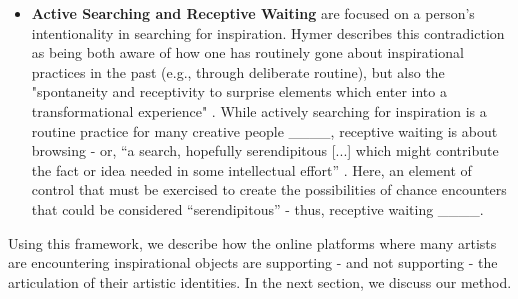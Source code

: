 \begin{itemize}
\item \textbf{Active Searching and Receptive Waiting} are focused on a person's intentionality in searching for inspiration. Hymer describes this contradiction as being both aware of how one has routinely gone about inspirational practices in the past (e.g., through deliberate routine), but also the "spontaneity and receptivity to surprise elements which enter into a transformational experience" \cite[~p.31]{hymer1990inspiration}. While actively searching for inspiration is a routine practice for many creative people ____, receptive waiting is about browsing - or, “a search, hopefully serendipitous [...] which might contribute the fact or idea needed in some intellectual effort” \cite[~p.4]{morse1970browsing}. Here, an element of control that must be exercised to create the possibilities of chance encounters that could be considered “serendipitous” - thus, receptive waiting  ____.

\end{itemize}

    Using this framework, we describe how the online platforms where many artists are encountering inspirational objects are supporting - and not supporting - the articulation of their artistic identities. In the next section, we discuss our method. \par